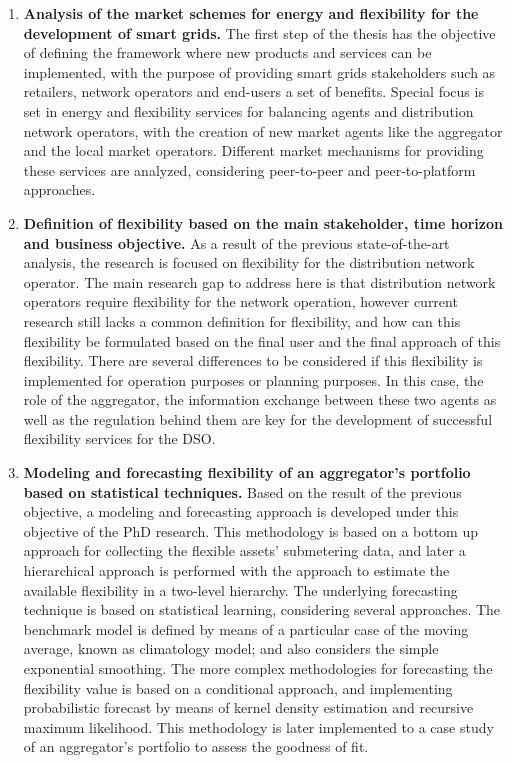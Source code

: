 \begin{enumerate}
\item \textbf{Analysis of the market schemes for energy and flexibility for the development of smart grids.} The first step of the thesis has the objective of defining the framework where new products and services can be implemented, with the purpose of providing smart grids stakeholders such as retailers, network operators and end-users a set of benefits. Special focus is set in energy and flexibility services for balancing agents and distribution network operators, with the creation of new market agents like the aggregator and the local market operators. Different market mechanisms for providing these services are analyzed, considering peer-to-peer and peer-to-platform approaches. 
\item \textbf{Definition of flexibility based on the main stakeholder, time horizon and business objective.} As a result of the previous state-of-the-art analysis, the research is focused on flexibility for the distribution network operator. The main research gap to address here is that distribution network operators require flexibility for the network operation, however current research still lacks a common definition for flexibility, and how can this flexibility be formulated based on the final user and the final approach of this flexibility. There are several differences to be considered if this flexibility is implemented for operation purposes or planning purposes. In this case, the role of the aggregator, the information exchange between these two agents as well as the regulation behind them are key for the development of successful flexibility services for the DSO.  
\item \textbf{Modeling and forecasting flexibility of an aggregator's portfolio based on statistical techniques.} Based on the result of the previous objective, a modeling and forecasting approach is developed under this objective of the PhD research. This methodology is based on a bottom up approach for collecting the flexible assets' submetering data, and later a hierarchical approach is performed with the approach to estimate the available flexibility in a two-level hierarchy. The underlying forecasting technique is based on statistical learning, considering several approaches. The benchmark model is defined by means of a particular case of the moving average, known as climatology model; and also considers the simple exponential smoothing. The more complex methodologies for forecasting the flexibility value is based on a conditional approach, and implementing probabilistic forecast by means of kernel density estimation and recursive maximum likelihood. This methodology is later implemented to a case study of an aggregator's portfolio to assess the goodness of fit. 

\end{enumerate}
